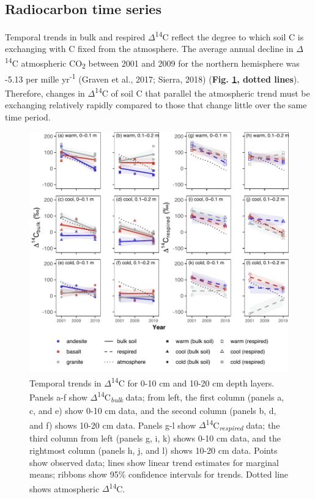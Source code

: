 \documentclass[english,man,floatsintext]{apa6}
\begin{document}
\hypertarget{radiocarbon-time-series}{%
\subsection{Radiocarbon time series}\label{radiocarbon-time-series}}

Temporal trends in bulk and respired \(\Delta\)\textsuperscript{14}C reflect the degree to which soil C is exchanging with C fixed from the atmosphere. The average annual decline in \(\Delta\)\textsuperscript{14}C atmospheric CO\textsubscript{2} between 2001 and 2009 for the northern hemisphere was -5.13 per mille yr\textsuperscript{-1} (Graven et al., 2017; Sierra, 2018) (\textbf{Fig. \ref{fig:plot-ts-14c}, dotted lines}). Therefore, changes in \(\Delta\)\textsuperscript{14}C of soil C that parallel the atmospheric trend must be exchanging relatively rapidly compared to those that change little over the same time period.



\begin{figure}

{\centering \includegraphics{sra-blk-inc-19_files/figure-latex/plot-ts-14c-1} 

}

\caption{Temporal trends in \(\Delta\)\textsuperscript{14}C for 0-10 cm and 10-20 cm depth layers. Panels a-f show \(\Delta\)\textsuperscript{14}C\textsubscript{\emph{bulk}} data; from left, the first column (panels a, c, and e) show 0-10 cm data, and the second column (panels b, d, and f) shows 10-20 cm data. Panels g-l show \(\Delta\)\textsuperscript{14}C\textsubscript{\emph{respired}} data; the third column from left (panels g, i, k) shows 0-10 cm data, and the rightmost column (panels h, j, and l) shows 10-20 cm data. Points show observed data; lines show linear trend estimates for marginal means; ribbons show 95\% confidence intervals for trends. Dotted line shows atmospheric \(\Delta\)\textsuperscript{14}C.}\label{fig:plot-ts-14c}
\end{figure}
\end{document}
